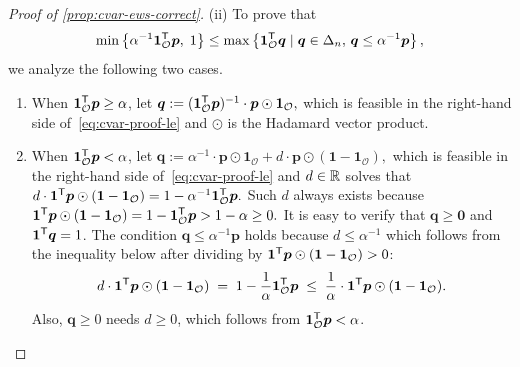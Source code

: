\begin{proof}[Proof of \cref{prop:cvar-ews-correct}]
(ii) To prove that 
\begin{equation} \label{eq:cvar-proof-le}
\min\left\{ \alpha^{-1} \bm{1}_{\mathcal{O}}^{\mathsf{T}} \bm{p},\; 1 \right\}
\le \max \left\{ \bm{1}_{\mathcal{O}}^{\mathsf{T}} \bm{q} \mid \bm{q} \in \Delta_{n}, \, \bm{q} \le \alpha^{-1} \bm{p}
\right\},
\end{equation}
we analyze the following two cases. 
\begin{enumerate}[nosep]
\item[(a)] When $\bm{1}_{\mathcal{O}}^{\mathsf{T}}  \bm{p} \ge \alpha$, let \(\bm{q} :=  (\bm{1}_{\mathcal{O}}^{\mathsf{T}} \bm{p})^{-1} \cdot \bm{p} \odot \bm{1}_{\mathcal{O}},
\) which is
feasible in the right-hand side of~\eqref{eq:cvar-proof-le} and $\odot$ is the Hadamard vector product. 
\item[(b)] When $\bm{1}_{\mathcal{O}}^{\mathsf{T}}  \bm{p} < \alpha$, let \(\bm{q} := \alpha^{-1} \cdot \bm{p} \odot \bm{1}_{\mathcal{O}}
+  d \cdot \bm{p} \odot (\bm{1} - \bm{1}_{\mathcal{O}}), \) which is
feasible in the right-hand side of~\eqref{eq:cvar-proof-le} and $d\in \mathbb{R} $ solves that
\(d \cdot \bm{1}^{\mathsf{T}} \bm{p} \odot (\bm{1} - \bm{1}_{\mathcal{O}}) = 1 - \alpha^{-1} \bm{1}_{\mathcal{O}}^{\mathsf{T}} \bm{p}.
\)
Such $d$ always exists because \(\bm{1}^{\mathsf{T}} \bm{p} \odot (\bm{1} - \bm{1}_{\mathcal{O}}) = 1 - \bm{1}_{\mathcal{O}}^{\mathsf{T}} \bm{p}  > 1 - \alpha \ge 0.
\)
It is easy to verify that $\bm{q} \ge \bm{0}$ and $\bm{1}^{\mathsf{T}} \bm{q} = 1$. The condition $\bm{q} \le \alpha^{-1} \bm{p}$ holds because $d \le \alpha^{-1}$ which follows from the inequality below after dividing by $\bm{1}^{\mathsf{T}} \bm{p} \odot (\bm{1} - \bm{1}_{\mathcal{O}}) > 0$:
\[
  d \cdot \bm{1}^{\mathsf{T}} \bm{p} \odot (\bm{1} - \bm{1}_{\mathcal{O}})
  \; =\; 
  1 - \frac{1}{\alpha } \bm{1}_{\mathcal{O}}^{\mathsf{T}} \bm{p}
  \; \le\; 
  \frac{1}{\alpha } \cdot \bm{1}^{\mathsf{T}} \bm{p} \odot (\bm{1} - \bm{1}_{\mathcal{O}}).
\]
Also, $\bm{q}\ge 0$ needs $d \ge 0$, which follows from $\bm{1}_{\mathcal{O}}^{\mathsf{T}}\bm{p} < \alpha$.
\end{enumerate}
\end{proof}


